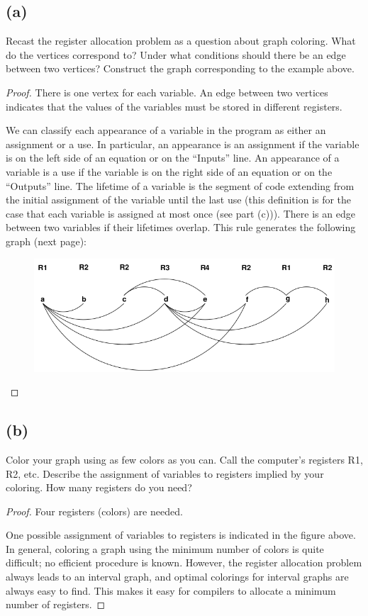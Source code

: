 \documentclass[14pt]{extarticle}
\begin{document}
\subsection{(a)}
Recast the register allocation problem as a question about graph coloring. What do the vertices correspond to? Under what conditions should there be an edge between two vertices? Construct the graph
corresponding to the example above.
\begin{proof}
There is one vertex for each variable. An edge between two vertices indicates that the values of the variables must be stored in different registers.

We can classify each appearance of a variable in the program as either an assignment or a use. In particular, an appearance is an assignment if the variable is on the left side of an equation or on
the “Inputs” line. An appearance of a variable is a use if the variable is on the right side of an equation or on the “Outputs” line. The lifetime of a variable is the segment of code extending from the initial assignment of the variable until the last use (this definition is for the case that each variable is assigned at most once (see part (c))). There is an edge between two variables if their lifetimes overlap. This rule generates the following graph (next page):
\begin{figure}[ht!]
\centering
\includegraphics[scale=0.5]{register.png}
\end{figure}
\end{proof}
\subsection{(b)}
Color your graph using as few colors as you can. Call the computer's registers R1, R2, etc. Describe the assignment of variables to registers implied by your coloring. How many registers do you need?
\begin{proof}
Four registers (colors) are needed.

One possible assignment of variables to registers is indicated in the figure above. In general, coloring a graph using the minimum number of colors is quite difficult; no efficient procedure is
known. However, the register allocation problem always leads to an interval graph, and optimal colorings for interval graphs are always easy to find. This makes it easy for compilers to allocate
a minimum number of registers.
\end{proof}
\end{document}
